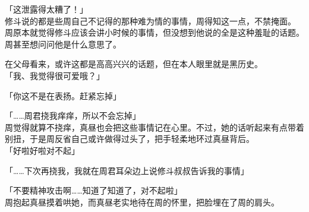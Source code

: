 「这泄露得太糟了！」\\

修斗说的都是些周自己不记得的那种难为情的事情，周得知这一点，不禁掩面。\\

周原本就觉得修斗应该会讲小时候的事情，但没想到他说的全是这种羞耻的话题。周甚至想问问他是什么意思了。

在父母看来，或许这都是高高兴兴的话题，但在本人眼里就是黑历史。\\

「我、我觉得很可爱哦？」

「你这不是在表扬。赶紧忘掉」

「……周君挠我痒痒，所以不会忘掉」\\

周觉得就算不挠痒，真昼也会把这些事情记在心里。不过，她的话听起来有点带着别扭，于是周反省自己或许做得过头了，把手轻柔地环过真昼背后。\\

「好啦好啦对不起」

「……下次再挠我，我就在周君耳朵边上说修斗叔叔告诉我的事情」

「不要精神攻击啊……知道了知道了，对不起啦」\\

周抱起真昼摸着哄她，而真昼老实地待在周的怀里，把脸埋在了周的肩头。
